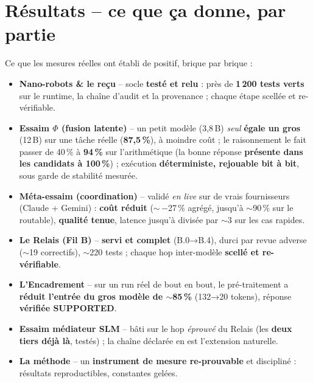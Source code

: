 \documentclass[11pt]{article}
\begin{document}
\clearpage
\section{Résultats -- ce que ça donne, par partie}
Ce que les mesures réelles ont établi de positif, brique par brique :
\begin{itemize}[leftmargin=1.3em,itemsep=2.5pt,topsep=3pt,label=\textendash]
\item \textbf{Nano-robots \& le reçu} -- socle \textbf{testé et relu} : près de \textbf{1\,200 tests
verts} sur le runtime, la chaîne d'audit et la provenance ; chaque étape scellée et re-vérifiable.
\item \textbf{Essaim $\Phi$ (fusion latente)} -- un petit modèle (3,8\,B) \emph{seul} \textbf{égale un
gros} (12\,B) sur une tâche réelle (\textbf{87,5\,\%}), à moindre coût ; le raisonnement le fait
passer de 40\,\% à \textbf{94\,\%} sur l'arithmétique (la bonne réponse \textbf{présente dans les
candidats à 100\,\%}) ; exécution \textbf{déterministe, rejouable bit à bit}, sous garde de
stabilité mesurée.
\item \textbf{Méta-essaim (coordination)} -- validé \emph{en live} sur de vrais fournisseurs (Claude
+ Gemini) : \textbf{coût réduit} ($\sim$\,−27\,\% agrégé, jusqu'à $\sim$90\,\% sur le routable),
\textbf{qualité tenue}, latence jusqu'à divisée par $\sim$3 sur les cas rapides.
\item \textbf{Le Relais (Fil B)} -- \textbf{servi et complet} (B.0→B.4), durci par revue adverse
($\sim$19 correctifs), $\sim$220 tests ; chaque hop inter-modèle \textbf{scellé et re-vérifiable}.
\item \textbf{L'Encadrement} -- sur un run réel de bout en bout, le pré-traitement a \textbf{réduit
l'entrée du gros modèle de $\sim$85\,\%} (132→20 tokens), réponse \textbf{vérifiée SUPPORTED}.
\item \textbf{Essaim médiateur SLM} -- bâti sur le hop \emph{éprouvé} du Relais (les \textbf{deux
tiers déjà là}, testés) ; la chaîne déclarée en est l'extension naturelle.
\item \textbf{La méthode} -- un \textbf{instrument de mesure re-prouvable} et discipliné : résultats
reproductibles, constantes gelées.
\end{itemize}
\end{document}
